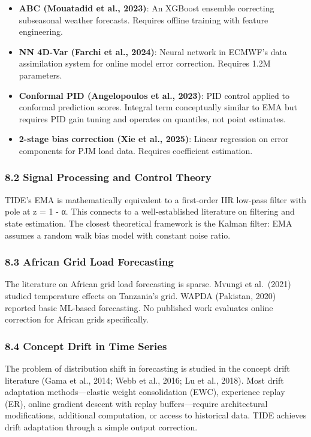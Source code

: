 \begin{itemize}
\tightlist
\item
  \textbf{ABC (Mouatadid et al., 2023)}: An XGBoost ensemble correcting
  subseasonal weather forecasts. Requires offline training with feature
  engineering.
\item
  \textbf{NN 4D-Var (Farchi et al., 2024)}: Neural network in ECMWF's
  data assimilation system for online model error correction. Requires
  1.2M parameters.
\item
  \textbf{Conformal PID (Angelopoulos et al., 2023)}: PID control
  applied to conformal prediction scores. Integral term conceptually
  similar to EMA but requires PID gain tuning and operates on quantiles,
  not point estimates.
\item
  \textbf{2-stage bias correction (Xie et al., 2025)}: Linear regression
  on error components for PJM load data. Requires coefficient
  estimation.
\end{itemize}

\subsubsection{8.2 Signal Processing and Control
Theory}\label{signal-processing-and-control-theory}

TIDE's EMA is mathematically equivalent to a first-order IIR low-pass
filter with pole at z = 1 - α. This connects to a well-established
literature on filtering and state estimation. The closest theoretical
framework is the Kalman filter: EMA assumes a random walk bias model
with constant noise ratio.

\subsubsection{8.3 African Grid Load
Forecasting}\label{african-grid-load-forecasting}

The literature on African grid load forecasting is sparse. Mvungi et
al.~(2021) studied temperature effects on Tanzania's grid. WAPDA
(Pakistan, 2020) reported basic ML-based forecasting. No published work
evaluates online correction for African grids specifically.

\subsubsection{8.4 Concept Drift in Time
Series}\label{concept-drift-in-time-series}

The problem of distribution shift in forecasting is studied in the
concept drift literature (Gama et al., 2014; Webb et al., 2016; Lu et
al., 2018). Most drift adaptation methods---elastic weight consolidation
(EWC), experience replay (ER), online gradient descent with replay
buffers---require architectural modifications, additional computation,
or access to historical data. TIDE achieves drift adaptation through a
simple output correction.

